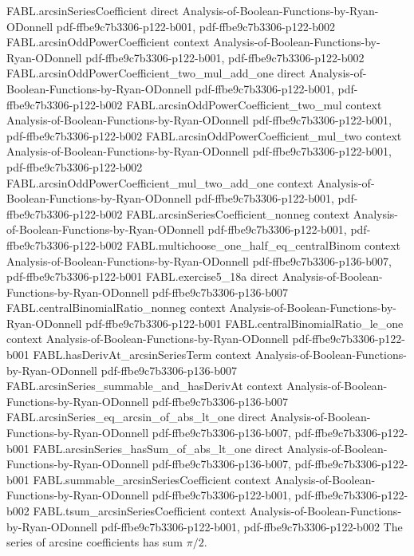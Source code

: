 \begin{lemma}
\label{FABL.arcsinSeries_hasSum_one}
\leanok
{}
\proofstep
  {FABL.arcsinSeriesCoefficient}
  {direct}
  {Analysis-of-Boolean-Functions-by-Ryan-ODonnell}
  {pdf-ffbe9c7b3306-p122-b001,
    pdf-ffbe9c7b3306-p122-b002}
\proofstep
  {FABL.arcsinOddPowerCoefficient}
  {context}
  {Analysis-of-Boolean-Functions-by-Ryan-ODonnell}
  {pdf-ffbe9c7b3306-p122-b001,
    pdf-ffbe9c7b3306-p122-b002}
\proofstep
  {FABL.arcsinOddPowerCoefficient_two_mul_add_one}
  {direct}
  {Analysis-of-Boolean-Functions-by-Ryan-ODonnell}
  {pdf-ffbe9c7b3306-p122-b001,
    pdf-ffbe9c7b3306-p122-b002}
\proofstep
  {FABL.arcsinOddPowerCoefficient_two_mul}
  {context}
  {Analysis-of-Boolean-Functions-by-Ryan-ODonnell}
  {pdf-ffbe9c7b3306-p122-b001,
    pdf-ffbe9c7b3306-p122-b002}
\proofstep
  {FABL.arcsinOddPowerCoefficient_mul_two}
  {context}
  {Analysis-of-Boolean-Functions-by-Ryan-ODonnell}
  {pdf-ffbe9c7b3306-p122-b001,
    pdf-ffbe9c7b3306-p122-b002}
\proofstep
  {FABL.arcsinOddPowerCoefficient_mul_two_add_one}
  {context}
  {Analysis-of-Boolean-Functions-by-Ryan-ODonnell}
  {pdf-ffbe9c7b3306-p122-b001,
    pdf-ffbe9c7b3306-p122-b002}
\proofstep
  {FABL.arcsinSeriesCoefficient_nonneg}
  {context}
  {Analysis-of-Boolean-Functions-by-Ryan-ODonnell}
  {pdf-ffbe9c7b3306-p122-b001,
    pdf-ffbe9c7b3306-p122-b002}
\proofstep
  {FABL.multichoose_one_half_eq_centralBinom}
  {context}
  {Analysis-of-Boolean-Functions-by-Ryan-ODonnell}
  {pdf-ffbe9c7b3306-p136-b007,
    pdf-ffbe9c7b3306-p122-b001}
\proofstep
  {FABL.exercise5_18a}
  {direct}
  {Analysis-of-Boolean-Functions-by-Ryan-ODonnell}
  {pdf-ffbe9c7b3306-p136-b007}
\proofstep
  {FABL.centralBinomialRatio_nonneg}
  {context}
  {Analysis-of-Boolean-Functions-by-Ryan-ODonnell}
  {pdf-ffbe9c7b3306-p122-b001}
\proofstep
  {FABL.centralBinomialRatio_le_one}
  {context}
  {Analysis-of-Boolean-Functions-by-Ryan-ODonnell}
  {pdf-ffbe9c7b3306-p122-b001}
\proofstep
  {FABL.hasDerivAt_arcsinSeriesTerm}
  {context}
  {Analysis-of-Boolean-Functions-by-Ryan-ODonnell}
  {pdf-ffbe9c7b3306-p136-b007}
\proofstep
  {FABL.arcsinSeries_summable_and_hasDerivAt}
  {context}
  {Analysis-of-Boolean-Functions-by-Ryan-ODonnell}
  {pdf-ffbe9c7b3306-p136-b007}
\proofstep
  {FABL.arcsinSeries_eq_arcsin_of_abs_lt_one}
  {direct}
  {Analysis-of-Boolean-Functions-by-Ryan-ODonnell}
  {pdf-ffbe9c7b3306-p136-b007,
    pdf-ffbe9c7b3306-p122-b001}
\proofstep
  {FABL.arcsinSeries_hasSum_of_abs_lt_one}
  {direct}
  {Analysis-of-Boolean-Functions-by-Ryan-ODonnell}
  {pdf-ffbe9c7b3306-p136-b007,
    pdf-ffbe9c7b3306-p122-b001}
\proofstep
  {FABL.summable_arcsinSeriesCoefficient}
  {context}
  {Analysis-of-Boolean-Functions-by-Ryan-ODonnell}
  {pdf-ffbe9c7b3306-p122-b001,
    pdf-ffbe9c7b3306-p122-b002}
\proofstep
  {FABL.tsum_arcsinSeriesCoefficient}
  {context}
  {Analysis-of-Boolean-Functions-by-Ryan-ODonnell}
  {pdf-ffbe9c7b3306-p122-b001,
    pdf-ffbe9c7b3306-p122-b002}
The series of arcsine coefficients has sum $\pi/2$.
\end{lemma}

